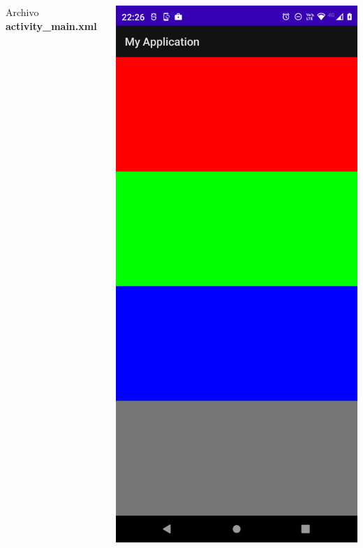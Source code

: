 \begin{frame}[fragile]
\begin{columns}
\begin{block}{Archivo \textbf{activity\_main.xml}}
\end{block}
\begin{center}
\includegraphics[width=0.95\linewidth]{00_CambiosInterfaz/Fase1.png}    
\end{center}
\end{columns}
\end{frame}


